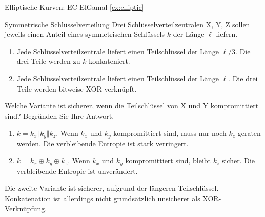 \documentclass{article}
\begin{document}
\begin{exercise}{Elliptische Kurven: EC-ElGamal \ref{ex:elliptic}}\end{exercise}


\setcounter{subsection}{70}
\begin{exercise}{Symmetrische Schlüsselverteilung}
  Drei Schlüsselverteilzentralen X, Y, Z sollen jeweils einen Anteil eines symmetrischen Schlüssels $k$ der Länge $\ell$ liefern.
  \begin{enumerate}
    \item Jede Schlüsselverteilzentrale liefert einen Teilschlüssel der Länge $\ell/3$. Die drei Teile werden zu $k$ konkateniert.
    \item Jede Schlüsselverteilzentrale liefert einen Teilschlüssel der Länge $\ell$. Die drei Teile werden bitweise XOR-verknüpft.
  \end{enumerate}
  Welche Variante ist sicherer, wenn die Teilschlüssel von X und Y kompromittiert sind? Begründen Sie Ihre Antwort.

  \begin{solution}
    \begin{enumerate}
      \item $k=k_x \Vert k_y \Vert k_z$. Wenn $k_x$ und $k_y$ kompromittiert sind, muss nur noch $k_z$ geraten werden. Die verbleibende Entropie ist stark verringert.
      \item $k=k_x \oplus k_y \oplus k_z$. Wenn $k_x$ und $k_y$ kompromittiert sind, bleibt $k_z$ sicher. Die verbleibende Entropie ist unverändert.
    \end{enumerate}
    Die zweite Variante ist sicherer, aufgrund der längeren Teilschlüssel. Konkatenation ist allerdings nicht grundsätzlich unsicherer als XOR-Verknüpfung.
  \end{solution}
\end{exercise}
\end{document}
